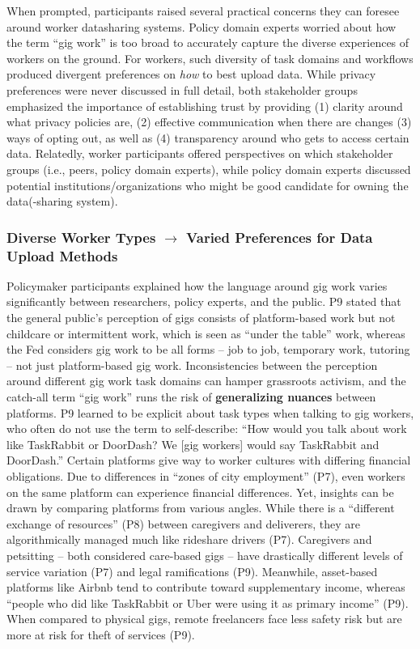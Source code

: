 {When prompted, participants raised several practical concerns they can foresee around worker datasharing systems. Policy domain experts worried about how the term ``gig work'' is too broad to accurately capture the diverse experiences of workers on the ground. For workers, such diversity of task domains and workflows produced divergent preferences on \textit{how} to best upload data. While privacy preferences were never discussed in full detail, both stakeholder groups emphasized the importance of establishing trust by providing (1) clarity around what privacy policies are, (2) effective communication when there are changes (3) ways of opting out, as well as (4) transparency around who gets to access certain data. Relatedly, worker participants offered perspectives on which stakeholder groups (i.e., peers, policy domain experts), while policy domain experts discussed potential institutions/organizations who might be good candidate for owning the data(-sharing system).}

\subsubsection{Diverse Worker Types $\rightarrow$ Varied Preferences for Data Upload Methods}\label{diverse_types}
Policymaker participants explained {how} the language around gig work varies significantly between researchers, policy experts, and the public. P9 stated {that} the general public's perception of gigs consists of platform-based work but not childcare or intermittent work, which is seen as ``under the table'' work, whereas the Fed considers gig work to be all forms – job to job, temporary work, tutoring – not just platform-based gig work. Inconsistencies between the perception around different gig work task domains can hamper grassroots activism, and the catch-all term ``gig work'' runs the risk of \textbf{generalizing nuances} between platforms. {P9} learned to be explicit about task types {when talking to gig workers, who often do not use the term to self-describe}: ``How would you talk about work like TaskRabbit or DoorDash? We [gig workers] would say TaskRabbit and DoorDash.'' Certain platforms give way to worker cultures with differing financial obligations. Due to differences in ``zones of city employment'' (P7), even workers on the same platform can experience financial differences. Yet, insights can be drawn by comparing platforms from various angles. While there is a ``different exchange of resources'' (P8) between caregivers and deliverers, {they are algorithmically} managed much like rideshare drivers (P7). Caregivers and petsitting – both considered care-based gigs – have drastically different levels of service variation (P7) and legal ramifications (P9). Meanwhile, asset-based platforms like Airbnb tend to contribute toward supplementary income, whereas ``people who did like TaskRabbit or Uber were using it as primary income'' (P9). When compared to physical gigs, remote freelancers face less safety risk but are more at risk for theft of services (P9).

